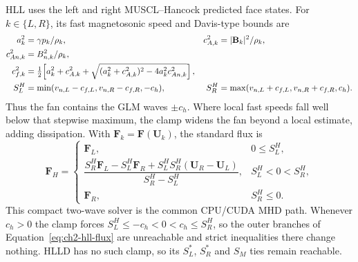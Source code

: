 HLL uses the left and right MUSCL--Hancock predicted face states. For
$k\in\{L,R\}$, its fast magnetosonic speed and Davis-type bounds are
\begin{align}
 a_k^2&=\gamma p_k/\rho_k,&
 c_{A,k}^2&=|\mathbf B_k|^2/\rho_k,\notag\\
 c_{An,k}^2&=B_{n,k}^2/\rho_k,\notag\\
 c_{f,k}^2&=\tfrac12\!\left[a_k^2+c_{A,k}^2+
 \sqrt{(a_k^2+c_{A,k}^2)^2-4a_k^2c_{An,k}^2}\right],\notag\\
 S_L^{H}&=\min(v_{n,L}-c_{f,L},v_{n,R}-c_{f,R},-c_h),&
 S_R^{H}&=\max(v_{n,L}+c_{f,L},v_{n,R}+c_{f,R},c_h).
 \label{eq:ch2-hll-speeds}
\end{align}
Thus the fan contains the GLM waves $\pm c_h$. Where local fast speeds fall
well below that stepwise maximum, the clamp widens the fan beyond a local
estimate, adding dissipation. With $\mathbf F_k=\mathbf F(\mathbf U_k)$, the
standard flux is
\begin{equation}
 \mathbf F_{H}=\begin{cases}
 \mathbf F_L,&0\le S_L^{H},\\
 \dfrac{S_R^{H}\mathbf F_L-S_L^{H}\mathbf F_R+
 S_L^{H}S_R^{H}(\mathbf U_R-\mathbf U_L)}{S_R^{H}-S_L^{H}},
   &S_L^{H}<0<S_R^{H},\\
 \mathbf F_R,&S_R^{H}\le0.
 \end{cases}
 \label{eq:ch2-hll-flux}
\end{equation}
This compact two-wave solver \citep{hartenLaxVanLeer1983} is the common
CPU/CUDA MHD path. Whenever $c_h>0$ the clamp forces
$S_L^{H}\le-c_h<0<c_h\le S_R^{H}$, so the outer branches of
Equation~\ref{eq:ch2-hll-flux} are unreachable and strict inequalities there
change nothing. HLLD has no such clamp, so its $S_L^*$, $S_R^*$ and $S_M$
ties remain reachable.

